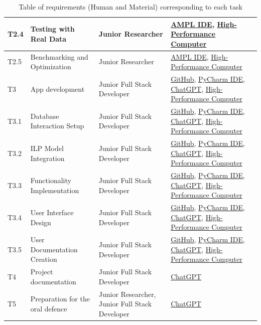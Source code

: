 \begin{landscape}
\begin{table}[!ht]
\begin{tabular}{|l|l|l|l|}
        T2.4 & Testing with Real Data & Junior Researcher & \hyperlink{ht:amplide}{AMPL IDE}, \hyperlink{ht:hpc}{High-Performance Computer} \\ \hline
        T2.5 & Benchmarking and Optimization & Junior Researcher & \hyperlink{ht:amplide}{AMPL IDE}, \hyperlink{ht:hpc}{High-Performance Computer} \\ \hline
        \rowcolor{black!15}
        T3 & App development & Junior Full Stack Developer & \hyperlink{ht:github}{GitHub}, \hyperlink{ht:pycharm}{PyCharm IDE}, \hyperlink{ht:chatgpt}{ChatGPT}, \hyperlink{ht:hpc}{High-Performance Computer} \\ \hline
        T3.1 & Database Interaction Setup & Junior Full Stack Developer & \hyperlink{ht:github}{GitHub}, \hyperlink{ht:pycharm}{PyCharm IDE}, \hyperlink{ht:chatgpt}{ChatGPT}, \hyperlink{ht:hpc}{High-Performance Computer} \\ \hline
        T3.2 & ILP Model Integration & Junior Full Stack Developer & \hyperlink{ht:github}{GitHub}, \hyperlink{ht:pycharm}{PyCharm IDE}, \hyperlink{ht:chatgpt}{ChatGPT}, \hyperlink{ht:hpc}{High-Performance Computer} \\ \hline
        T3.3 & Functionality Implementation & Junior Full Stack Developer & \hyperlink{ht:github}{GitHub}, \hyperlink{ht:pycharm}{PyCharm IDE}, \hyperlink{ht:chatgpt}{ChatGPT}, \hyperlink{ht:hpc}{High-Performance Computer} \\ \hline
        T3.4 & User Interface Design & Junior Full Stack Developer & \hyperlink{ht:github}{GitHub}, \hyperlink{ht:pycharm}{PyCharm IDE}, \hyperlink{ht:chatgpt}{ChatGPT}, \hyperlink{ht:hpc}{High-Performance Computer} \\ \hline
        T3.5 & User Documentation Creation & Junior Full Stack Developer & \hyperlink{ht:github}{GitHub}, \hyperlink{ht:pycharm}{PyCharm IDE}, \hyperlink{ht:chatgpt}{ChatGPT}, \hyperlink{ht:hpc}{High-Performance Computer} \\ \hline
        \rowcolor{black!15}
        T4 & Project documentation & Junior Full Stack Developer & \hyperlink{ht:chatgpt}{ChatGPT} \\ \hline
        \rowcolor{black!15}
        T5 & Preparation for the oral defence & Junior Researcher, Junior Full Stack Developer & \hyperlink{ht:chatgpt}{ChatGPT} \\ \hline
    \end{tabular}
    \caption{Table of requirements (Human and Material) corresponding to each task}
    \label{tab:requirementsHRMat}
\end{table}
\end{landscape}

